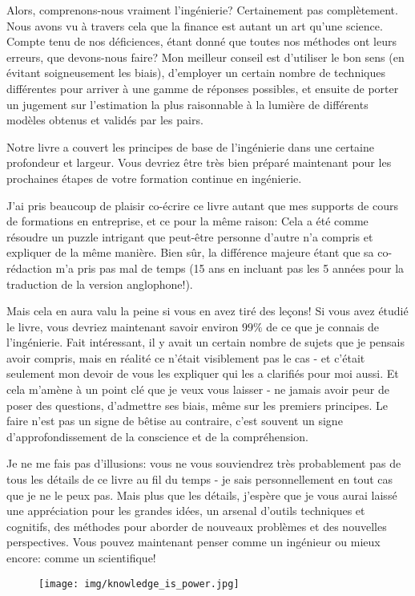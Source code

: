 \documentclass[12pt,a4paper,twoside,openright]{report}
\theoremstyle{definition}
\theoremstyle{itexmp}
\numberwithin{equation}{section}
\begin{document}
	Alors, comprenons-nous vraiment l'ingénierie? Certainement pas complètement. Nous avons vu à travers cela que la finance est autant un art qu'une science. Compte tenu de nos déficiences, étant donné que toutes nos méthodes ont leurs erreurs, que devons-nous faire? Mon meilleur conseil est d'utiliser le bon sens (en évitant soigneusement les biais), d'employer un certain nombre de techniques différentes pour arriver à une gamme de réponses possibles, et ensuite de porter un jugement sur l'estimation la plus raisonnable à la lumière de différents modèles obtenus et validés par les pairs.
	
	Notre livre a couvert les principes de base de l'ingénierie dans une certaine profondeur et largeur. Vous devriez être très bien préparé maintenant pour les prochaines étapes de votre formation continue en ingénierie.
	
	J'ai pris beaucoup de plaisir co-écrire ce livre autant que mes supports de cours de formations en entreprise, et ce pour la même raison: Cela a été comme résoudre un puzzle intrigant que peut-être personne d'autre n'a compris et expliquer de la même manière. Bien sûr, la différence majeure étant que sa co-rédaction m'a pris pas mal de temps (15 ans en incluant pas les 5 années pour la traduction de la version anglophone!).
	
	Mais cela en aura valu la peine si vous en avez tiré des leçons! Si vous avez étudié le livre, vous devriez maintenant savoir environ $99\%$ de ce que je connais de l'ingénierie. Fait intéressant, il y avait un certain nombre de sujets que je pensais avoir compris, mais en réalité ce n'était visiblement pas le cas - et c'était seulement mon devoir de vous les expliquer qui les a clarifiés pour moi aussi. Et cela m'amène à un point clé que je veux vous laisser - ne jamais avoir peur de poser des questions, d'admettre ses biais, même sur les premiers principes. Le faire n'est pas un signe de bêtise au contraire, c'est souvent un signe d'approfondissement de la conscience et de la compréhension.

	Je ne me fais pas d'illusions: vous ne vous souviendrez très probablement pas de tous les détails de ce livre au fil du temps - je sais personnellement en tout cas que je ne le peux pas. Mais plus que les détails, j'espère que je vous aurai laissé une appréciation pour les grandes idées, un arsenal d'outils techniques et cognitifs, des méthodes pour aborder de nouveaux problèmes et des nouvelles perspectives. Vous pouvez maintenant penser comme un ingénieur ou mieux encore: comme un scientifique!
	\begin{figure}[H]
		\centering
		\texttt{[image: img/knowledge\_is\_power.jpg]}	
	\end{figure}
	
\end{document}
